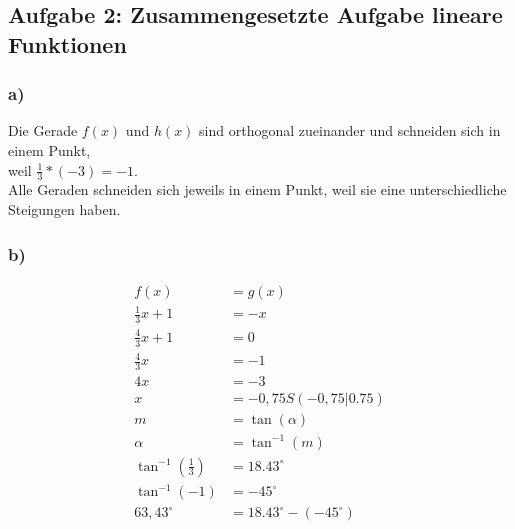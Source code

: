 \documentclass[a4paper]{article}
\begin{document}
\subsection*{\textbf{Aufgabe 2: Zusammengesetzte Aufgabe lineare Funktionen}}
	\begin{minipage}{1\textwidth}
		\subsubsection*{a)}
			Die Gerade $f(x)$ und $h(x)$ sind orthogonal zueinander und schneiden sich in einem Punkt, \\
			weil $\frac{1}{3} * (-3) = -1$. \\
			Alle Geraden schneiden sich jeweils in einem Punkt, weil sie eine unterschiedliche Steigungen haben.
	\end{minipage}
	\begin{minipage}{0.5\textwidth}
		\vspace*{-5mm}
		\subsubsection*{b)}
			\begin{align*}
				f(x) &= g(x) \\
				\frac{1}{3}x + 1 &= -x \\
				\frac{4}{3}x + 1 &= 0 \\
				\frac{4}{3}x &= -1 \\
				4x &= -3 \\
				x &= -0,75 
				S(-0,75 | 0.75) \\
				m &= \tan(\alpha) \\
				\alpha &= \tan^{-1}(m) \\
				\tan^{-1}(\frac{1}{3}) &= 18.43^{\circ} \\
				\tan^{-1}(-1) &= -45^{\circ}\\
				63,43^{\circ} &= 18.43^{\circ} -(-45^{\circ}) \\ 
			\end{align*}
		\end{minipage}
\end{document}
